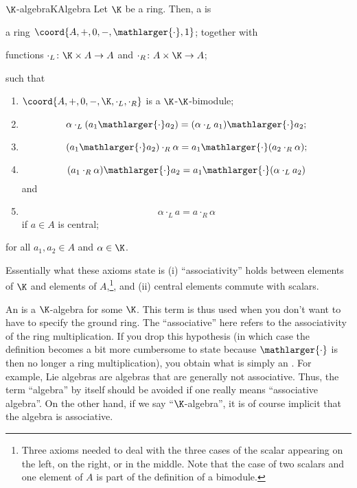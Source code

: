 \begin{dfn}{$\K$-algebra}{KAlgebra}
	Let $\K$ be a ring.  Then, a  is
	\begin{data}
		\item a ring $\coord{A,+,0,-,\mathlarger{\cdot},1}$; together with
		\item functions $\cdot _L\colon \K \times A\rightarrow A$ and $\cdot _R\colon A\times \K \rightarrow A$;
	\end{data}
	such that
	\begin{enumerate}
		\item \label{KAlgebra(i)}$\coord{A,+,0,-,\K ,\cdot _L,\cdot _R}$ is a $\K$-$\K$-bimodule;
		\item \label{KAlgebra(ii)}
		\begin{equation}
			\alpha \cdot _L(a_1\mathlarger{\cdot}a_2)=(\alpha \cdot _La_1)\mathlarger{\cdot}a_2;
		\end{equation}
		\item \label{KAlgebra(iii)}
		\begin{equation}
			(a_1\mathlarger{\cdot}a_2)\cdot _R\alpha =a_1\mathlarger{\cdot}(a_2\cdot _R\alpha );
		\end{equation}
		\item \label{KAlgebra(iiix)}
		\begin{equation}
			(a_1\cdot _R\alpha )\mathlarger{\cdot}a_2=a_1\mathlarger{\cdot}(\alpha \cdot _La_2)
		\end{equation}
		and
		\item \label{KAlgebra(iv)}
		\begin{equation}
			\alpha \cdot _La=a\cdot _R\alpha
		\end{equation}
		if $a\in A$ is central;
	\end{enumerate}
	for all $a_1,a_2\in A$ and $\alpha \in \K$.
	\begin{rmk}
		Essentially what these axioms state is (i) ``associativity'' holds between elements of $\K$ and elements of $A$,\footnote{Three axioms needed to deal with the three cases of the scalar appearing on the left, on the right, or in the middle.  Note that the case of two scalars and one element of $A$ is part of the definition of a bimodule.}, and (ii) central elements commute with scalars.
	\end{rmk}
	\begin{rmk}
		An  is a $\K$-algebra for some $\K$.  This term is thus used when you don't want to have to specify the ground ring.  The ``associative'' here refers to the associativity of the ring multiplication.  If you drop this hypothesis (in which case the definition becomes a bit more cumbersome to state because $\mathlarger{\cdot}$ is then no longer a ring multiplication), you obtain what is simply an .  For example, Lie algebras are algebras that are generally not associative.  Thus, the term ``algebra'' by itself should be avoided if one really means ``associative algebra''.  On the other hand, if we say ``$\K$-algebra'', it is of course implicit that the algebra is associative.

\end{rmk}
\end{dfn}
